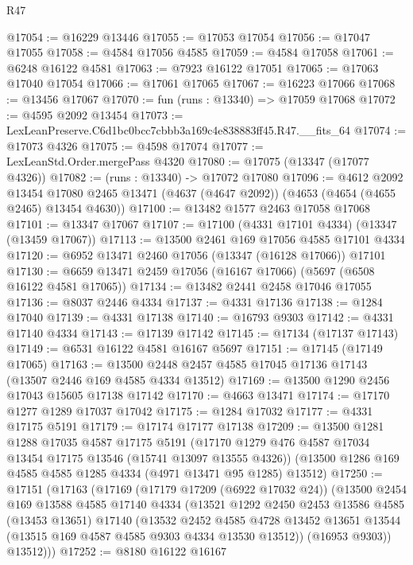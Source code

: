\begin{lexlean}{R47}
\begin{coremodule}
@17054 := @16229 @13446
@17055 := @17053 @17054
@17056 := @17047 @17055
@17058 := @4584 @17056 @4585
@17059 := @4584 @17058
@17061 := @6248 @16122 @4581
@17063 := @7923 @16122 @17051
@17065 := @17063 @17040 @17054
@17066 := @17061 @17065
@17067 := @16223 @17066
@17068 := @13456 @17067
@17070 := fun (runs : @13340) => @17059 @17068
@17072 := @4595 @2092 @13454
@17073 := LexLeanPreserve.C6d1bc0bcc7cbbb3a169c4e838883ff45.R47.__fits_64
@17074 := @17073 @4326
@17075 := @4598 @17074
@17077 := LexLeanStd.Order.mergePass @4320
@17080 := @17075 (@13347 (@17077 @4326))
@17082 := (runs : @13340) -> @17072 @17080
@17096 := @4612
    @2092
    @13454
    @17080
    @2465
    @13471
    (@4637 (@4647 @2092))
    (@4653 (@4654 (@4655 @2465) @13454 @4630))
@17100 := @13482 @1577 @2463 @17058 @17068
@17101 := @13347 @17067
@17107 := @17100 (@4331 @17101 @4334) (@13347 (@13459 @17067))
@17113 := @13500 @2461 @169 @17056 @4585 @17101 @4334
@17120 := @6952 @13471 @2460 @17056 (@13347 (@16128 @17066)) @17101
@17130 := @6659 @13471 @2459 @17056 (@16167 @17066) (@5697 (@6508 @16122 @4581 @17065))
@17134 := @13482 @2441 @2458 @17046 @17055
@17136 := @8037 @2446 @4334
@17137 := @4331 @17136
@17138 := @1284 @17040
@17139 := @4331 @17138
@17140 := @16793 @9303
@17142 := @4331 @17140 @4334
@17143 := @17139 @17142
@17145 := @17134 (@17137 @17143)
@17149 := @6531 @16122 @4581 @16167 @5697
@17151 := @17145 (@17149 @17065)
@17163 := @13500 @2448 @2457 @4585 @17045 @17136 @17143 (@13507 @2446 @169 @4585 @4334 @13512)
@17169 := @13500 @1290 @2456 @17043 @15605 @17138 @17142
@17170 := @4663 @13471
@17174 := @17170 @1277 @1289 @17037 @17042
@17175 := @1284 @17032
@17177 := @4331 @17175 @5191
@17179 := @17174 @17177 @17138
@17209 := @13500
    @1281
    @1288
    @17035
    @4587
    @17175
    @5191
    (@17170 @1279 @476 @4587 @17034 @13454 @17175 @13546 (@15741 @13097 @13555 @4326))
    (@13500 @1286 @169 @4585 @4585 @1285 @4334 (@4971 @13471 @95 @1285) @13512)
@17250 := @17151
    (@17163
      (@17169
        (@17179 @17209 (@6922 @17032 @24))
        (@13500
          @2454
          @169
          @13588
          @4585
          @17140
          @4334
          (@13521
            @1292
            @2450
            @2453
            @13586
            @4585
            (@13453 @13651)
            @17140
            (@13532
              @2452
              @4585
              @4728
              @13452
              @13651
              @13544
              (@13515 @169 @4587 @4585 @9303 @4334 @13530 @13512))
            (@16953 @9303))
          @13512)))
@17252 := @8180 @16122 @16167

\end{coremodule}
\end{lexlean}

